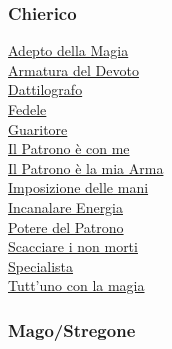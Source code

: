 \begin{multicols}{3}
{\begin{flushleft}
\titlespacing*{\subsubsection}{0pt}{0.5em}{0.5em}\subsubsection*{Chierico}

\hyperlink{Adepto della Magia}{Adepto della Magia}\\
\hyperlink{Armatura del Devoto}{Armatura del Devoto}\\
\hyperlink{Dattilografo}{Dattilografo}\\
\hyperlink{Fedele}{Fedele}\\
\hyperlink{Guaritore}{Guaritore}\\
\hyperlink{Il Patrono è con me}{Il Patrono è con me}\\
\hyperlink{Il Patrono è la mia Arma}{Il Patrono è la mia Arma}\\
\hyperlink{Imposizione delle mani}{Imposizione delle mani}\\
\hyperlink{Incanalare Energia}{Incanalare Energia}\\
\hyperlink{Potere del Patrono}{Potere del Patrono}\\
\hyperlink{Scacciare i non morti}{Scacciare i non morti}\\
\hyperlink{Specialista}{Specialista}\\
\hyperlink{Tutt'uno con la magia}{Tutt'uno con la magia}


\titlespacing*{\subsubsection}{0pt}{0.5em}{0.5em}\subsubsection*{Mago/Stregone}


\end{flushleft}}
\end{multicols}
